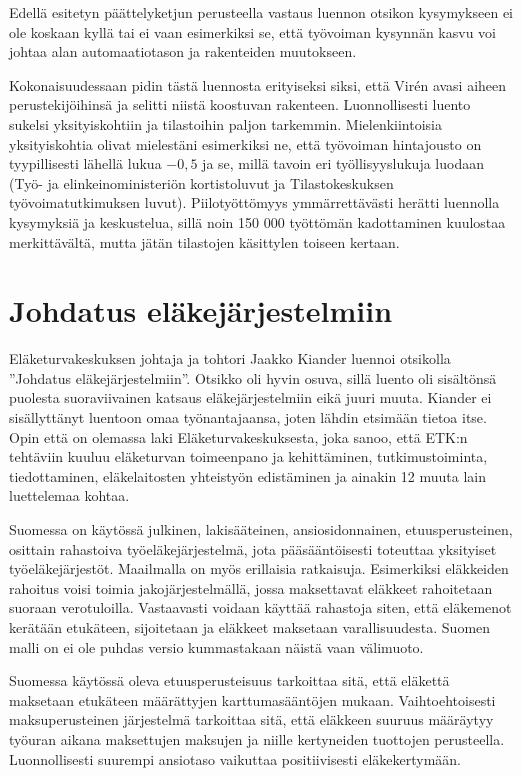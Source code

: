 \documentclass[12pt]{article}
\begin{document}
Edellä esitetyn päättelyketjun perusteella vastaus luennon otsikon kysymykseen ei ole koskaan kyllä tai ei vaan esimerkiksi se, että työvoiman kysynnän kasvu voi johtaa alan automaatiotason ja rakenteiden muutokseen.

Kokonaisuudessaan pidin tästä luennosta erityiseksi siksi, että Virén avasi aiheen perustekijöihinsä ja selitti niistä koostuvan rakenteen. Luonnollisesti luento sukelsi yksityiskohtiin ja tilastoihin paljon tarkemmin. Mielenkiintoisia yksityiskohtia olivat mielestäni esimerkiksi ne, että työvoiman hintajousto on tyypillisesti lähellä lukua $-0,5$ ja se, millä tavoin eri työllisyyslukuja luodaan (Työ- ja elinkeinoministeriön kortistoluvut ja Tilastokeskuksen työ\-voi\-ma\-tut\-ki\-muk\-sen luvut). Piilotyöttömyys ymmärrettävästi herätti luennolla kysymyksiä ja keskustelua, sillä noin 150 000 työttömän kadottaminen kuulostaa merkittävältä, mutta jätän tilastojen käsittylen toiseen kertaan.


\newpage
\section{Johdatus eläkejärjestelmiin}

Eläketurvakeskuksen johtaja ja tohtori Jaakko Kiander luennoi otsikolla ''Johdatus eläkejärjestelmiin''. Otsikko oli hyvin osuva, sillä luento oli sisältönsä puolesta suoraviivainen katsaus eläkejärjestelmiin eikä juuri muuta. Kiander ei sisällyttänyt luentoon omaa työnantajaansa, joten lähdin etsimään tietoa itse. Opin että on olemassa laki Eläketurvakeskuksesta, joka sanoo, että ETK:n tehtäviin kuuluu eläketurvan toimeenpano ja kehittäminen, tutkimustoiminta, tiedottaminen, eläkelaitosten yhteistyön edistäminen ja ainakin 12 muuta lain luettelemaa kohtaa.

Suomessa on käytössä julkinen, lakisääteinen, ansiosidonnainen, etuusperusteinen, osittain rahastoiva työeläkejärjestelmä, jota pääsääntöisesti toteuttaa yksityiset työeläkejärjestöt. Maailmalla on myös erillaisia ratkaisuja. Esimerkiksi eläkkeiden rahoitus voisi toimia jakojärjestelmällä, jossa maksettavat eläkkeet rahoitetaan suoraan verotuloilla. Vastaavasti voidaan käyttää rahastoja siten, että eläkemenot kerätään etukäteen, sijoitetaan ja eläkkeet maksetaan varallisuudesta. Suomen malli on ei ole puhdas versio kummastakaan näistä vaan välimuoto.

Suomessa käytössä oleva etuusperusteisuus tarkoittaa sitä, että eläkettä maksetaan etukäteen määrättyjen karttumasääntöjen mukaan. Vaihtoehtoisesti maksuperusteinen järjestelmä tarkoittaa sitä, että eläkkeen suuruus määräytyy työuran aikana maksettujen maksujen ja niille kertyneiden tuottojen perusteella. Luonnollisesti suurempi ansiotaso vaikuttaa positiivisesti eläkekertymään.
\end{document}
